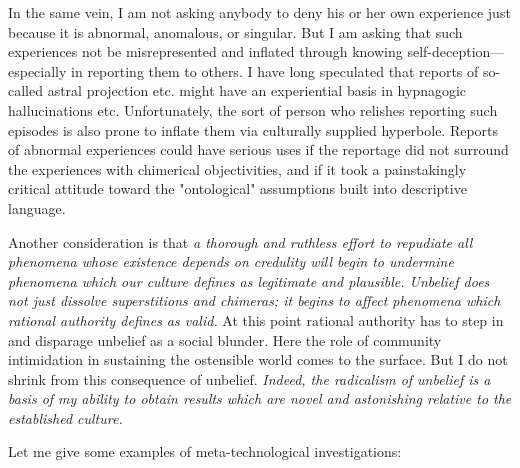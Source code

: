 In the same vein, I am not asking anybody to deny his or her own experience just 
because it is abnormal, anomalous, or singular. But I am asking that such experiences 
not be misrepresented and inflated through knowing self-deception---especially 
in reporting them to others. I have long speculated that reports of 
so-called astral projection etc. might have an experiential basis in hypnagogic 
hallucinations etc. Unfortunately, the sort of person who relishes reporting such 
episodes is also prone to inflate them via culturally supplied hyperbole. Reports of 
abnormal experiences could have serious uses if the reportage did not surround the 
experiences with chimerical objectivities, and if it took a painstakingly critical 
attitude toward the "ontological" assumptions built into descriptive language. 

Another consideration is that \textit{a thorough and ruthless effort to repudiate all 
phenomena whose existence depends on credulity will begin to undermine phenomena which 
our culture defines as legitimate and plausible. Unbelief does not just dissolve 
superstitions and chimeras; it begins to affect phenomena which rational authority defines as 
valid.} At this point rational authority has to step in and disparage unbelief as a 
social blunder. Here the role of community intimidation in sustaining the ostensible 
world comes to the surface. But I do not shrink from this consequence of 
unbelief. \textit{Indeed, the radicalism of unbelief is a basis of my ability to obtain results which 
are novel and astonishing relative to the established culture.}

\visbreak

Let me give some examples of meta-technological investigations: 

